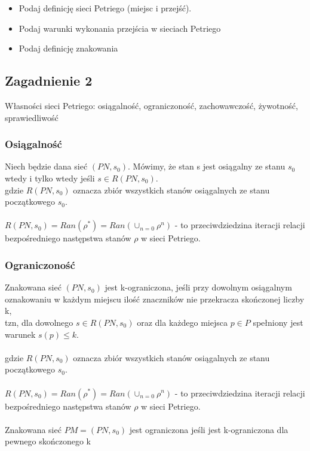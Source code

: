 \documentclass[a4paper,15pt]{article}
\newcommand{\definition}[2]{
    \begin{tcolorbox}[colback=green!5!white,colframe=mGreen,title={Definicja -  #1}]
        #2
    \end{tcolorbox}
}
\newcommand{\question}[2]{
    \begin{tcolorbox}[colback=black!5!white,colframe=black,title={Zagadnienie #1}]
        #2
    \end{tcolorbox}
}
\begin{document}
\begin{framed}
\begin{itemize}
\item Podaj definicję sieci Petriego (miejsc i przejść).
\item Podaj warunki wykonania przejścia w sieciach Petriego
\item Podaj definicję znakowania
\end{itemize}
\end{framed}

\newpage
\subsection{Zagadnienie 2}
\question{2}{
Własności sieci Petriego: osiągalność, ograniczoność, zachowawczość,
żywotność, sprawiedliwość
}

\subsubsection{Osiągalność}

\definition{Osiągalność}{
Niech będzie dana sieć $(PN, s_0)$. Mówimy, że stan s jest osiągalny ze stanu $s_0$ wtedy i tylko wtedy jeśli $s \in R(PN, s_0)$. \\
gdzie $R(PN,s_0)$ oznacza zbiór wszystkich stanów osiągalnych ze stanu początkowego $s_0$. \\ \\
$R(PN,s_0) = Ran(\rho ^*) = Ran (\cup_{n=0}\rho ^n)$ - to przeciwdziedzina iteracji relacji bezpośredniego następstwa stanów $\rho$ w sieci Petriego.
}


\subsubsection{Ograniczoność}
\definition{Ograniczoność}{
Znakowana sieć $(PN, s_0)$ jest k-ograniczona, jeśli przy dowolnym osiągalnym oznakowaniu w każdym miejscu ilość znaczników nie przekracza skończonej liczby k, \\ 
tzn, dla dowolnego $s \in R(PN, s_0)$ oraz dla każdego miejsca $p\in P$ spełniony jest warunek $s(p)\leq k$. \\ \\
gdzie $R(PN,s_0)$ oznacza zbiór wszystkich stanów osiągalnych ze stanu początkowego $s_0$. \\ \\
$R(PN,s_0) = Ran(\rho ^*) = Ran (\cup_{n=0}\rho ^n)$ - to przeciwdziedzina iteracji relacji bezpośredniego następstwa stanów $\rho$ w sieci Petriego. \\ \\
Znakowana sieć $PM = (PN, s_0)$ jest ograniczona jeśli jest k-ograniczona dla pewnego skończonego k
}
\end{document}
